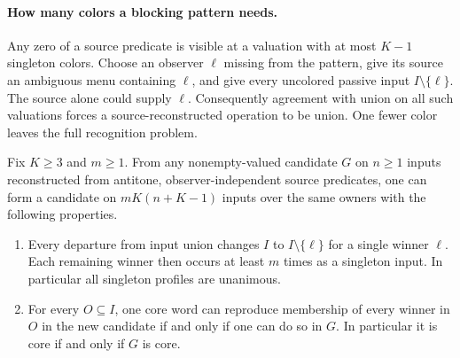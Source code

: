 \paragraph{How many colors a blocking pattern needs.}
Any zero of a source predicate is visible at a valuation with at most
$K-1$ singleton colors. Choose an observer $\ell$ missing from the
pattern, give its source an ambiguous menu containing $\ell$, and give
every uncolored passive input $I\setminus\{\ell\}$. The source alone
could supply $\ell$. Consequently agreement with union on all such
valuations forces a source-reconstructed operation to be union. One
fewer color leaves the full recognition problem.

\begin{theorem}
\label{core:thm:mixed-guard-reduction}
Fix $K\geq3$ and $m\geq1$. From any nonempty-valued candidate $G$ on
$n\geq1$ inputs reconstructed from antitone, observer-independent
source predicates, one can form a candidate on $mK(n+K-1)$ inputs
over the same owners with the following properties.
\begin{enumerate}
\item Every departure from input union changes $I$ to
$I\setminus\{\ell\}$ for a single winner $\ell$. Each remaining
winner then occurs at least $m$ times as a singleton input. In
particular all singleton profiles are unanimous.
\item For every $O\subseteq I$, one core word can reproduce
membership of every winner in $O$ in the new candidate if and only
if one can do so in $G$. In particular it is core if and only if
$G$ is core.
\end{enumerate}
\end{theorem}
